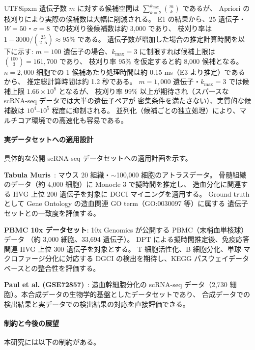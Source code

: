 \documentclass[11pt,a4paper]{article}
\begin{document}
\begin{CJK}{UTF8}{ipxm}
遺伝子数 $m$ に対する候補空間は $\sum_{k=2}^{k_{\max}} \binom{m}{k}$ であるが、
Apriori の枝刈りにより実際の候補数は大幅に削減される。
E1 の結果から、25 遺伝子・$W=50$・$\sigma=8$ での枝刈り後候補数は約 3,000 であり、
枝刈り率は $1 - 3000/\binom{25}{2..5} \approx 95\%$ である。
遺伝子数が増加した場合の推定計算時間を以下に示す:
$m = 100$ 遺伝子の場合、$k_{\max} = 3$ に制限すれば候補上限は $\binom{100}{3} = 161{,}700$ であり、
枝刈り率 95\% を仮定すると約 8,000 候補となる。
$n = 2{,}000$ 細胞での 1 候補あたり処理時間は約 0.15 ms（E3 より推定）であるから、
推定総計算時間は約 1.2 秒である。
$m = 1{,}000$ 遺伝子・$k_{\max} = 3$ では候補上限 $1.66 \times 10^8$ となるが、
枝刈り率 99\% 以上が期待され（スパースな scRNA-seq データでは大半の遺伝子ペアが
密集条件を満たさない）、実質的な候補数は $10^4$--$10^5$ 程度に抑制される。
並列化（候補ごとの独立処理）により、マルチコア環境での高速化も容易である。

\paragraph{実データセットへの適用設計}
具体的な公開 scRNA-seq データセットへの適用計画を示す。

\textbf{Tabula Muris}~\cite{tabula2018single}: マウス 20 組織・$\sim$100,000 細胞のアトラスデータ。
骨髄組織のデータ（約 4,000 細胞）に Monocle 3 で擬時間を推定し、
造血分化に関連する HVG 上位 200 遺伝子を対象に DGCI マイニングを適用する。
Ground truth として Gene Ontology の造血関連 GO term（GO:0030097 等）に属する
遺伝子セットとの一致度を評価する。

\textbf{PBMC 10x データセット}: 10x Genomics が公開する PBMC（末梢血単核球）データ
（約 3,000 細胞、33,694 遺伝子）。
DPT による擬時間推定後、免疫応答関連 HVG 上位 300 遺伝子を対象とする。
T 細胞活性化、B 細胞分化、単球-マクロファージ分化に対応する
DGCI の検出を期待し、KEGG パスウェイデータベースとの整合性を評価する。

\textbf{Paul et al. (GSE72857)}~\cite{paul2015transcriptional}: 造血幹細胞分化の
scRNA-seq データ（2,730 細胞）。本合成データの生物学的基盤としたデータセットであり、
合成データでの検出結果と実データでの検出結果の対応を直接評価できる。

\paragraph{制約と今後の展望}
本研究には以下の制約がある。


\end{CJK}
\end{document}
